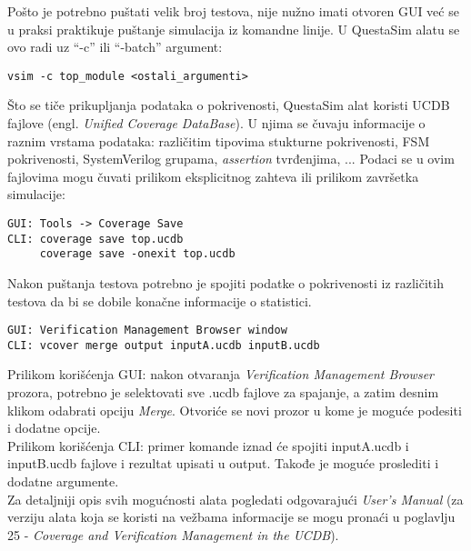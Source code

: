 Pošto je potrebno puštati velik broj testova, nije nužno imati otvoren GUI već
se u praksi praktikuje puštanje simulacija iz komandne linije. U QuestaSim alatu
se ovo radi uz ``-c'' ili ``-batch'' argument:

\begin{lstlisting}
vsim -c top_module <ostali_argumenti>
\end{lstlisting}

Što se tiče prikupljanja podataka o pokrivenosti, QuestaSim alat koristi UCDB
fajlove (engl. \emph{Unified Coverage DataBase}). U njima se čuvaju informacije
o raznim vrstama podataka: različitim tipovima stukturne pokrivenosti, FSM
pokrivenosti, SystemVerilog grupama, \emph{assertion} tvrđenjima, ... Podaci se
u ovim fajlovima mogu čuvati prilikom eksplicitnog zahteva ili prilikom
završetka simulacije:

\begin{lstlisting}
GUI: Tools -> Coverage Save
CLI: coverage save top.ucdb
     coverage save -onexit top.ucdb
\end{lstlisting}

Nakon puštanja testova potrebno je spojiti podatke o pokrivenosti iz različitih
testova da bi se dobile konačne informacije o statistici.

\begin{lstlisting}
GUI: Verification Management Browser window
CLI: vcover merge output inputA.ucdb inputB.ucdb
\end{lstlisting}

Prilikom korišćenja GUI: nakon otvaranja \emph{Verification Management Browser}
prozora, potrebno je selektovati sve .ucdb fajlove za spajanje, a zatim desnim
klikom odabrati opciju \emph{Merge}.
Otvoriće se novi prozor u kome je moguće podesiti i dodatne opcije.\\

Prilikom korišćenja CLI: primer komande iznad će spojiti inputA.ucdb i
inputB.ucdb fajlove i rezultat upisati u output. Takođe je moguće proslediti i
dodatne argumente.\\

Za detaljniji opis svih mogućnosti alata pogledati odgovarajući \emph{User’s
  Manual} (za verziju alata koja se koristi na vežbama informacije se mogu
pronaći u poglavlju 25 - \emph{Coverage and Verification Management in the
  UCDB}).


